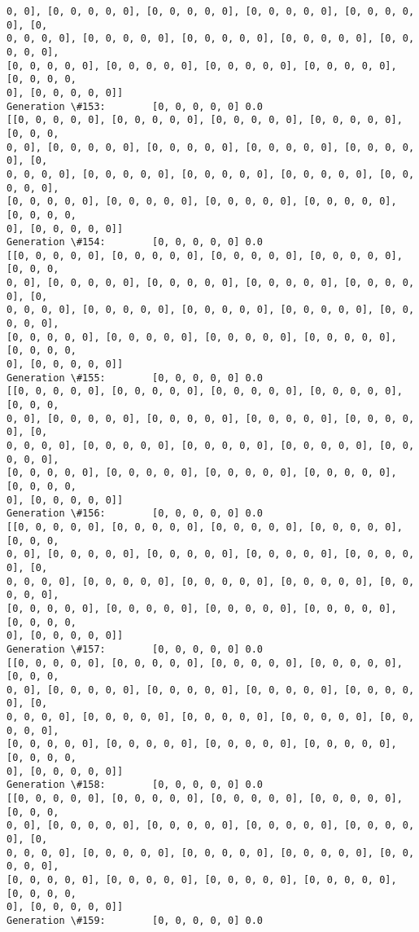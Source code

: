 \documentclass[11pt]{article}
\begin{document}
\begin{Verbatim}[commandchars=\\\{\}]
0, 0], [0, 0, 0, 0, 0], [0, 0, 0, 0, 0], [0, 0, 0, 0, 0], [0, 0, 0, 0, 0], [0,
0, 0, 0, 0], [0, 0, 0, 0, 0], [0, 0, 0, 0, 0], [0, 0, 0, 0, 0], [0, 0, 0, 0, 0],
[0, 0, 0, 0, 0], [0, 0, 0, 0, 0], [0, 0, 0, 0, 0], [0, 0, 0, 0, 0], [0, 0, 0, 0,
0], [0, 0, 0, 0, 0]]
Generation \#153:        [0, 0, 0, 0, 0] 0.0
[[0, 0, 0, 0, 0], [0, 0, 0, 0, 0], [0, 0, 0, 0, 0], [0, 0, 0, 0, 0], [0, 0, 0,
0, 0], [0, 0, 0, 0, 0], [0, 0, 0, 0, 0], [0, 0, 0, 0, 0], [0, 0, 0, 0, 0], [0,
0, 0, 0, 0], [0, 0, 0, 0, 0], [0, 0, 0, 0, 0], [0, 0, 0, 0, 0], [0, 0, 0, 0, 0],
[0, 0, 0, 0, 0], [0, 0, 0, 0, 0], [0, 0, 0, 0, 0], [0, 0, 0, 0, 0], [0, 0, 0, 0,
0], [0, 0, 0, 0, 0]]
Generation \#154:        [0, 0, 0, 0, 0] 0.0
[[0, 0, 0, 0, 0], [0, 0, 0, 0, 0], [0, 0, 0, 0, 0], [0, 0, 0, 0, 0], [0, 0, 0,
0, 0], [0, 0, 0, 0, 0], [0, 0, 0, 0, 0], [0, 0, 0, 0, 0], [0, 0, 0, 0, 0], [0,
0, 0, 0, 0], [0, 0, 0, 0, 0], [0, 0, 0, 0, 0], [0, 0, 0, 0, 0], [0, 0, 0, 0, 0],
[0, 0, 0, 0, 0], [0, 0, 0, 0, 0], [0, 0, 0, 0, 0], [0, 0, 0, 0, 0], [0, 0, 0, 0,
0], [0, 0, 0, 0, 0]]
Generation \#155:        [0, 0, 0, 0, 0] 0.0
[[0, 0, 0, 0, 0], [0, 0, 0, 0, 0], [0, 0, 0, 0, 0], [0, 0, 0, 0, 0], [0, 0, 0,
0, 0], [0, 0, 0, 0, 0], [0, 0, 0, 0, 0], [0, 0, 0, 0, 0], [0, 0, 0, 0, 0], [0,
0, 0, 0, 0], [0, 0, 0, 0, 0], [0, 0, 0, 0, 0], [0, 0, 0, 0, 0], [0, 0, 0, 0, 0],
[0, 0, 0, 0, 0], [0, 0, 0, 0, 0], [0, 0, 0, 0, 0], [0, 0, 0, 0, 0], [0, 0, 0, 0,
0], [0, 0, 0, 0, 0]]
Generation \#156:        [0, 0, 0, 0, 0] 0.0
[[0, 0, 0, 0, 0], [0, 0, 0, 0, 0], [0, 0, 0, 0, 0], [0, 0, 0, 0, 0], [0, 0, 0,
0, 0], [0, 0, 0, 0, 0], [0, 0, 0, 0, 0], [0, 0, 0, 0, 0], [0, 0, 0, 0, 0], [0,
0, 0, 0, 0], [0, 0, 0, 0, 0], [0, 0, 0, 0, 0], [0, 0, 0, 0, 0], [0, 0, 0, 0, 0],
[0, 0, 0, 0, 0], [0, 0, 0, 0, 0], [0, 0, 0, 0, 0], [0, 0, 0, 0, 0], [0, 0, 0, 0,
0], [0, 0, 0, 0, 0]]
Generation \#157:        [0, 0, 0, 0, 0] 0.0
[[0, 0, 0, 0, 0], [0, 0, 0, 0, 0], [0, 0, 0, 0, 0], [0, 0, 0, 0, 0], [0, 0, 0,
0, 0], [0, 0, 0, 0, 0], [0, 0, 0, 0, 0], [0, 0, 0, 0, 0], [0, 0, 0, 0, 0], [0,
0, 0, 0, 0], [0, 0, 0, 0, 0], [0, 0, 0, 0, 0], [0, 0, 0, 0, 0], [0, 0, 0, 0, 0],
[0, 0, 0, 0, 0], [0, 0, 0, 0, 0], [0, 0, 0, 0, 0], [0, 0, 0, 0, 0], [0, 0, 0, 0,
0], [0, 0, 0, 0, 0]]
Generation \#158:        [0, 0, 0, 0, 0] 0.0
[[0, 0, 0, 0, 0], [0, 0, 0, 0, 0], [0, 0, 0, 0, 0], [0, 0, 0, 0, 0], [0, 0, 0,
0, 0], [0, 0, 0, 0, 0], [0, 0, 0, 0, 0], [0, 0, 0, 0, 0], [0, 0, 0, 0, 0], [0,
0, 0, 0, 0], [0, 0, 0, 0, 0], [0, 0, 0, 0, 0], [0, 0, 0, 0, 0], [0, 0, 0, 0, 0],
[0, 0, 0, 0, 0], [0, 0, 0, 0, 0], [0, 0, 0, 0, 0], [0, 0, 0, 0, 0], [0, 0, 0, 0,
0], [0, 0, 0, 0, 0]]
Generation \#159:        [0, 0, 0, 0, 0] 0.0

\end{Verbatim}
\end{document}
